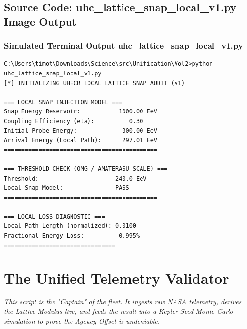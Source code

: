 \documentclass[11pt, letterpaper, openany]{book}
\begin{document}
\section*{Source Code: uhc_lattice_snap_local_v1.py Image Output}

\subsection*{Simulated Terminal Output uhc_lattice_snap_local_v1.py}
\begin{lstlisting}[style=terminal]
C:\Users\timot\Downloads\Science\src\Unification\Vol2>python uhc_lattice_snap_local_v1.py
[*] INITIALIZING UHECR LOCAL LATTICE SNAP AUDIT (v1)

=== LOCAL SNAP INJECTION MODEL ===
Snap Energy Reservoir:           1000.00 EeV
Coupling Efficiency (eta):          0.30
Initial Probe Energy:             300.00 EeV
Arrival Energy (Local Path):      297.01 EeV
============================================

=== THRESHOLD CHECK (OMG / AMATERASU SCALE) ===
Threshold:                      240.0 EeV
Local Snap Model:               PASS
============================================

=== LOCAL LOSS DIAGNOSTIC ===
Local Path Length (normalized): 0.0100
Fractional Energy Loss:          0.995%
================================

\end{lstlisting}

\chapter{The Unified Telemetry Validator}
\label{app:unified_validator}
\textit{This script is the "Captain" of the fleet. It ingests raw NASA telemetry, derives the Lattice Modulus live, and feeds the result into a Kepler-Seed Monte Carlo simulation to prove the Agency Offset is undeniable.}
\end{document}
